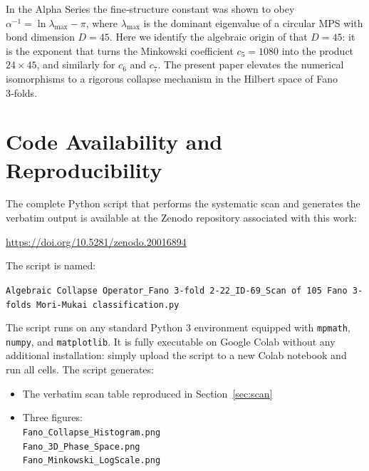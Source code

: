 \documentclass[12pt]{article}
\begin{document}
In the Alpha Series \cite{alpha_series} the fine‑structure constant was shown
to obey \(\alpha^{-1} = \ln\lambda_{\max} - \pi\), where \(\lambda_{\max}\) is
the dominant eigenvalue of a circular MPS with bond dimension \(D=45\).
Here we identify the algebraic origin of that \(D=45\): it is the exponent
that turns the Minkowski coefficient \(c_5 = 1080\) into the product
\(24\times45\), and similarly for \(c_6\) and \(c_7\). The present paper
elevates the numerical isomorphisms to a rigorous collapse mechanism in the
Hilbert space of Fano 3‑folds.

\section{Code Availability and Reproducibility}

The complete Python script that performs the systematic scan and generates
the verbatim output is available at the Zenodo repository associated with
this work:

\begin{center}
\url{https://doi.org/10.5281/zenodo.20016894}
\end{center}

The script is named:
\begin{center}
\texttt{Algebraic Collapse Operator\_Fano 3-fold 2-22\_ID-69\_Scan of 105 Fano 3-folds Mori-Mukai classification.py}
\end{center}

The script runs on any standard Python 3 environment equipped with
\texttt{mpmath}, \texttt{numpy}, and \texttt{matplotlib}. It is fully
executable on Google Colab without any additional installation:
simply upload the script to a new Colab notebook and run all cells.
The script generates:
\begin{itemize}
  \item The verbatim scan table reproduced in Section~\ref{sec:scan}
  \item Three figures: \\
      \hspace*{1cm} \texttt{Fano\_Collapse\_Histogram.png} \\
      \hspace*{1cm} \texttt{Fano\_3D\_Phase\_Space.png} \\
      \hspace*{1cm} \texttt{Fano\_Minkowski\_LogScale.png}
\end{itemize}
\end{document}
